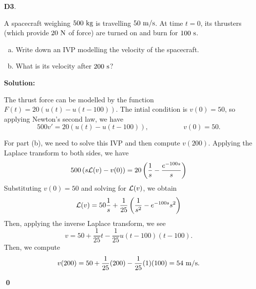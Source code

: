 \documentclass{article}
\newenvironment{problem}[1]
{
  \begin{flushleft}
  \textbf{#1}.
  \ignorespaces
}
{
  \end{flushleft}
}
\newenvironment{solution}
{
  \ignorespaces
  \textbf{Solution:}
}
{
  \ignorespacesafterend
  \begin{flushright}
  {\bfseries \qed}
  \end{flushright}
}
\begin{document}
\begin{problem}{D3}
A spacecraft weighing \(500\ {\rm kg}\) is travelling \(50\ {\rm m/s}\).  At time \(t=0\), its thrusters (which provide \(20\ {\rm N}\) of force) are turned on and burn for \(100\ {\rm s}\).  
\begin{enumerate}[(a)]
\item Write down an IVP modelling the velocity of the spacecraft.
\item What is its velocity after \(200\ {\rm s}\)?
\end{enumerate}
\end{problem}
\begin{solution}
The thrust force can be modelled by the function \(F(t)= 20 \left( u(t)-u(t-100)\right)\).  The intial condition is \(v(0)=50\), so applying Newton's second law, we have
\[ 500v' = 20 \left( u(t)-u(t-100)\right), \hspace{5em} v(0)=50.\]

For part (b), we need to solve this IVP and then compute \(v(200)\).  Applying the Laplace transform to both sides, we have
\[ 500 \left( s\mathcal{L}(v) - v(0) \right) = 20 \left( \frac{1}{s} - \frac{ e^{-100s}}{s} \right) \]
Substituting \(v(0)=50\) and solving for \(\mathcal{L}(v)\), we obtain
\[\mathcal{L}(v) = 50\frac{1}{s} + \frac{1}{25} \left( \frac{1}{s^2} - e^{-100s}{s^2} \right)\]
Then, applying the inverse Laplace transform, we see
\[v=50+\frac{1}{25}t-\frac{1}{25} u(t-100)(t-100).\]
Then, we compute \[v(200)=50+\frac{1}{25}(200)- \frac{1}{25}(1)(100) = 54\ {\rm m/s}.\]
\end{solution}
\end{document}

